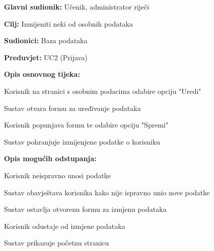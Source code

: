 				\noindent {}
				\begin{packed_item}
					
					\item \textbf{Glavni sudionik: }Učenik, administrator riječi
					\item  \textbf{Cilj:} Izmijeniti neki od osobnih podataka
					\item  \textbf{Sudionici:} Baza podataka
					\item  \textbf{Preduvjet:} UC2 (Prijava)
					\item  \textbf{Opis osnovnog tijeka:}
					
					\item[] \begin{packed_enum}
						
						\item Korisnik na stranici s osobnim podacima odabire opciju "Uredi"
						\item Sustav otvara formu za uređivanje podataka
						\item Korisnik popunjava formu te odabire opciju "Spremi"
						\item Sustav pohranjuje izmijenjene podatke o korisniku
						
					\end{packed_enum}
					
					\item  \textbf{Opis mogućih odstupanja:}
					
					\item[] \begin{packed_item}
						
						\item[3.a] Korisnik neispravno unosi podatke 
						\item[] \begin{packed_enum}
							
							\item Sustav obavještava korisnika kako nije ispravno unio nove podatke
							\item Sustav ostavlja otvorenu formu za izmjenu podataka
							
						\end{packed_enum}
						
						\item[3.b] Korisnik odustaje od izmjene podataka 
						\item[] \begin{packed_enum}
							
							\item Sustav prikazuje početnu stranicu
							
						\end{packed_enum}
						
						
					\end{packed_item}
				\end{packed_item}
				
